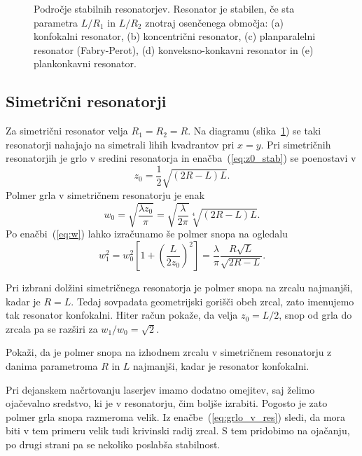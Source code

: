 \begin{figure}[h]
\centering
\def\svgwidth{100truemm} 

\caption{Področje stabilnih resonatorjev. Resonator je stabilen, 
če sta parametra $L/R_{1}$ in $L/R_{2}$ znotraj osenčenega območja: (a) konfokalni resonator,
(b) koncentrični resonator, (c) planparalelni resonator (Fabry-Perot), 
(d) konveksno-konkavni resonator in (e) plankonkavni resonator.}
\label{fig:Podrocje-stabilnih-resonatorjev}
\end{figure}

\subsection*{Simetrični resonatorji}
Za simetrični resonator velja $R_{1}=R_{2}=R$. Na diagramu 
(slika~\ref{fig:Podrocje-stabilnih-resonatorjev}) 
se taki resonatorji nahajajo na simetrali lihih kvadrantov pri $x=y$. Pri simetričnih resonatorjih 
je grlo v sredini resonatorja in enačba~(\ref{eq:z0_stab}) se poenostavi v 
\begin{equation}
z_{0}=\frac{1}{2}\sqrt{(2R-L)L}.
\label{eq:zosim}
\end{equation}
Polmer grla v simetričnem resonatorju je enak
\begin{equation}
w_{0}=\sqrt{\frac{\lambda z_{0}}{\pi}}=\sqrt{\frac{\lambda}{2\pi}}\sqrt[4]{(2R-L)L}.
\label{eq:grlo_v_res}
\end{equation}
Po enačbi~(\ref{eq:w}) lahko izračunamo še polmer snopa na ogledalu
\begin{equation}
w_{1}^{2}=w_{0}^{2}\left[1+\left(\frac{L}{2z_{0}}\right)^{2}\right]=
\frac{\lambda}{\pi}\frac{R\sqrt{L}}{\sqrt{2R-L}}.
\end{equation}

Pri izbrani dolžini simetričnega resonatorja je polmer snopa na zrcalu najmanjši,
kadar je $R=L$. Tedaj sovpadata geometrijski gorišči obeh zrcal,
zato imenujemo tak resonator konfokalni. 
Hiter račun pokaže, da velja $z_{0}=L/2$, snop od grla do zrcala pa se razširi
za $w_1/w_0=\sqrt{2}$. 
\begin{definition}
\label{naloga:uklon_konf}
 Pokaži, da je polmer snopa na izhodnem zrcalu v simetričnem resonatorju z
 danima parametroma $R$ in $L$ najmanjši, kadar je resonator konfokalni.
\end{definition}

Pri dejanskem načrtovanju laserjev imamo dodatno omejitev, saj želimo 
ojačevalno sredstvo, ki je v resonatorju, čim boljše izrabiti. Pogosto je zato 
polmer grla snopa razmeroma velik. Iz enačbe~(\ref{eq:grlo_v_res})
sledi, da mora biti v tem primeru velik tudi krivinski radij zrcal. S tem
pridobimo na ojačanju, po drugi strani pa se nekoliko poslabša stabilnost.

